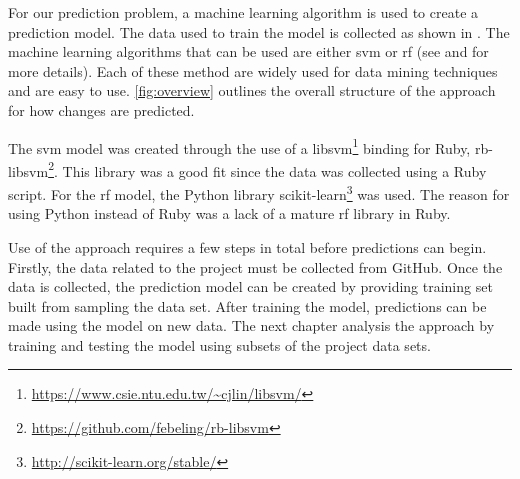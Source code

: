 
For our prediction problem, a machine learning algorithm is used to create a prediction model. The data used to train the model is collected as shown in . The machine learning algorithms that can be used are either \gls{svm} or \gls{rf} (see  and  for more details). Each of these method are widely used for data mining techniques and are easy to use. \autoref{fig:overview} outlines the overall structure of the approach for how changes are predicted.


The \gls{svm} model was created through the use of a libsvm\footnote{\url{https://www.csie.ntu.edu.tw/~cjlin/libsvm/}} binding for Ruby, rb-libsvm\footnote{\url{https://github.com/febeling/rb-libsvm}}. This library was a good fit since the data was collected using a Ruby script. For the \gls{rf} model, the Python library scikit-learn\footnote{\url{http://scikit-learn.org/stable/}} was used. The reason for using Python instead of Ruby was a lack of a mature \gls{rf} library in Ruby.

Use of the approach requires a few steps in total before predictions can begin. Firstly, the data related to the project must be collected from GitHub. Once the data is collected, the prediction model can be created by providing training set built from sampling the data set. After training the model, predictions can be made using the model on new data. The next chapter analysis the approach by training and testing the model using subsets of the project data sets.